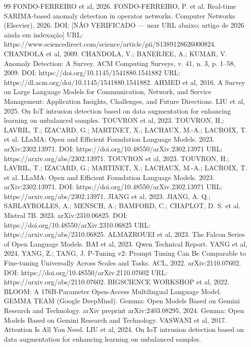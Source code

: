 \documentclass[12pt,a4paper]{article}
\begin{document}
\begin{thebibliography}{99}
 FONDO-FERREIRO et al, 2026. FONDO-FERREIRO, P. et al. Real-time SARIMA-based anomaly detection in operator networks. Computer Networks (Elsevier), 2026. DOI: [NÃO VERIFICADO — usar URL abaixo; artigo de 2026 ainda em indexação] URL: https://www.sciencedirect.com/science/article/pii/S1389128626000824.
 CHANDOLA et al, 2009. CHANDOLA, V.; BANERJEE, A.; KUMAR, V. Anomaly Detection: A Survey. ACM Computing Surveys, v. 41, n. 3, p. 1–58, 2009. DOI: https://doi.org/10.1145/1541880.1541882 URL: https://dl.acm.org/doi/10.1145/1541880.1541882.
 AHMED et al, 2016. A Survey on Large Language Models for Communication, Network, and Service Management: Application Insights, Challenges, and Future Directions.
 LIU et al, 2025. On IoT intrusion detection based on data augmentation for enhancing learning on unbalanced samples.
 TOUVRON et al, 2023. TOUVRON, H.; LAVRIL, T.; IZACARD, G.; MARTINET, X.; LACHAUX, M.-A.; LACROIX, T. et al. LLaMA: Open and Efficient Foundation Language Models. 2023. arXiv:2302.13971. DOI: https://doi.org/10.48550/arXiv.2302.13971 URL: https://arxiv.org/abs/2302.13971.
 TOUVRON et al, 2023. TOUVRON, H.; LAVRIL, T.; IZACARD, G.; MARTINET, X.; LACHAUX, M.-A.; LACROIX, T. et al. LLaMA: Open and Efficient Foundation Language Models. 2023. arXiv:2302.13971. DOI: https://doi.org/10.48550/arXiv.2302.13971 URL: https://arxiv.org/abs/2302.13971.
 JIANG et al, 2023. JIANG, A. Q.; SABLAYROLLES, A.; MENSCH, A.; BAMFORD, C.; CHAPLOT, D. S. et al. Mistral 7B. 2023. arXiv:2310.06825. DOI: https://doi.org/10.48550/arXiv.2310.06825 URL: https://arxiv.org/abs/2310.06825.
 ALMAZROUEI et al, 2023. The Falcon Series of Open Language Models.
 BAI et al, 2023. Qwen Technical Report.
 YANG et al, 2024. YANG, Z.; TANG, J. P-Tuning v2: Prompt Tuning Can Be Comparable to Fine-tuning Universally Across Scales and Tasks. ACL, 2022. arXiv:2110.07602. DOI: https://doi.org/10.48550/arXiv.2110.07602 URL: https://arxiv.org/abs/2110.07602.
 BIGSCIENCE WORKSHOP et al, 2022. BLOOM: A 176B-Parameter Open-Access Multilingual Language Model.
 GEMMA TEAM (Google DeepMind). Gemma: Open Models Based on Gemini Research and Technology. arXiv preprint arXiv:2403.08295, 2024. Gemma: Open Models Based on Gemini Research and Technology.
 VASWANI et al, 2017. Attention Is All You Need.
 LIU et al, 2024. On IoT intrusion detection based on data augmentation for enhancing learning on unbalanced samples.

\end{thebibliography}
\end{document}
